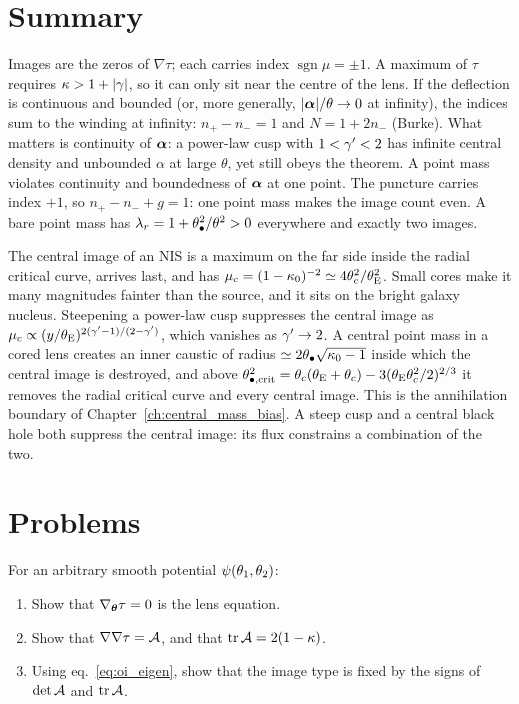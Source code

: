 \section{Summary}
\label{sec:oi_summary}

Images are the zeros of $\nabla\tau$; each carries index
$\operatorname{sgn}\mu=\pm1$.  A maximum of $\tau$ requires
$\kappa>1+|\gamma|$, so it can only sit near the centre of
the lens.
If the deflection is continuous and bounded (or, more
generally, $|\boldsymbol{\alpha}|/\theta\to0$ at infinity), the indices
sum to the winding at infinity: $n_+-n_-=1$ and $N=1+2n_-$
(Burke).  What matters is continuity of $\boldsymbol{\alpha}$: a
power-law cusp with $1<\gamma'<2$ has infinite central density
and unbounded $\alpha$ at large $\theta$, yet still obeys the
theorem.
A point mass violates continuity and boundedness of
$\boldsymbol{\alpha}$ at one point.  The puncture carries index $+1$, so
$n_+-n_-+g=1$: one point mass makes the image count even.  A
bare point mass has $\lambda_r=1+\theta_{\bullet}^2/\theta^2>0$
everywhere and exactly two images.

The central image of an NIS is a maximum on the far side
inside the radial critical curve, arrives last, and has
$\mu_c=(1-\kappa_0)^{-2}\simeq4\theta_c^2/\theta_{\mathrm{E}}^2$.  Small
cores make it many magnitudes fainter than the source, and it
sits on the bright galaxy nucleus.
Steepening a power-law cusp suppresses the central image as
$\mu_c\propto(y/\theta_{\mathrm{E}})^{2(\gamma'-1)/(2-\gamma')}$, which vanishes
as $\gamma'\to2$.
A central point mass in a cored lens creates an inner caustic
of radius $\simeq2\theta_{\bullet}\sqrt{\kappa_0-1}$ inside which the
central image is destroyed, and above
$\theta_{\bullet,\rm crit}^2=\theta_c(\theta_{\mathrm{E}}+\theta_c)-3(\theta_{\mathrm{E}}\theta_c^2/2)^{2/3}$
it removes the radial critical curve and every central image.
This is the annihilation boundary of
Chapter~\ref{ch:central_mass_bias}.
A steep cusp and a central black hole both suppress the
central image: its flux constrains a combination of the two.


\section{Problems}
\label{sec:oi_problems}

\begin{exercise}
\label{ex:oi_gradient_hessian}
For an arbitrary smooth potential $\psi(\theta_1,\theta_2)$:
\begin{enumerate}[label=(\alph*)]
    \item Show that $\nabla_{\boldsymbol{\theta}}\tau=0$ is the lens equation.
    \item Show that $\nabla\nabla\tau=\mathcal{A}$, and that
          $\operatorname{tr}\mathcal{A}=2(1-\kappa)$.
    \item Using eq.~\eqref{eq:oi_eigen}, show that the image type is
          fixed by the signs of $\det\mathcal{A}$ and $\operatorname{tr}\mathcal{A}$.
\end{enumerate}
\end{exercise}

